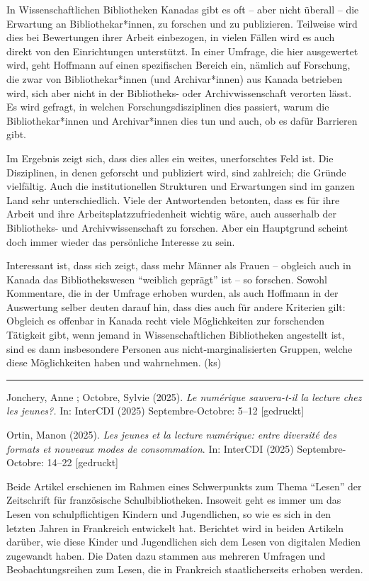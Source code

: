 \documentclass[a4paper,
fontsize=11pt,
oneside,
numbers=noperiodatend,
parskip=half-,
bibliography=totoc,
final
]{scrartcl}
\begin{document}
In Wissenschaftlichen Bibliotheken Kanadas gibt es oft -- aber nicht
überall -- die Erwartung an Bibliothekar*innen, zu forschen und zu
publizieren. Teilweise wird dies bei Bewertungen ihrer Arbeit
einbezogen, in vielen Fällen wird es auch direkt von den Einrichtungen
unterstützt. In einer Umfrage, die hier ausgewertet wird, geht Hoffmann
auf einen spezifischen Bereich ein, nämlich auf Forschung, die zwar von
Bibliothekar*innen (und Archivar*innen) aus Kanada betrieben wird, sich
aber nicht in der Bibliotheks- oder Archivwissenschaft verorten lässt.
Es wird gefragt, in welchen Forschungsdisziplinen dies passiert, warum
die Bibliothekar*innen und Archivar*innen dies tun und auch, ob es dafür
Barrieren gibt.

Im Ergebnis zeigt sich, dass dies alles ein weites, unerforschtes Feld
ist. Die Disziplinen, in denen geforscht und publiziert wird, sind
zahlreich; die Gründe vielfältig. Auch die institutionellen Strukturen
und Erwartungen sind im ganzen Land sehr unterschiedlich. Viele der
Antwortenden betonten, dass es für ihre Arbeit und ihre
Arbeitsplatzzufriedenheit wichtig wäre, auch ausserhalb der Bibliotheks-
und Archivwissenschaft zu forschen. Aber ein Hauptgrund scheint doch
immer wieder das persönliche Interesse zu sein.

Interessant ist, dass sich zeigt, dass mehr Männer als Frauen --
obgleich auch in Kanada das Bibliothekswesen \enquote{weiblich geprägt}
ist -- so forschen. Sowohl Kommentare, die in der Umfrage erhoben
wurden, als auch Hoffmann in der Auswertung selber deuten darauf hin,
dass dies auch für andere Kriterien gilt: Obgleich es offenbar in Kanada
recht viele Möglichkeiten zur forschenden Tätigkeit gibt, wenn jemand in
Wissenschaftlichen Bibliotheken angestellt ist, sind es dann
insbesondere Personen aus nicht-marginalisierten Gruppen, welche diese
Möglichkeiten haben und wahrnehmen. (ks)

\begin{center}\rule{0.5\linewidth}{0.5pt}\end{center}

Jonchery, Anne ; Octobre, Sylvie (2025). \emph{Le numérique sauvera-t-il
la lecture chez les jeunes?.} In: InterCDI (2025) Septembre-Octobre:
5--12 {[}gedruckt{]}

Ortin, Manon (2025). \emph{Les jeunes et la lecture numérique: entre
diversité des formats et nouveaux modes de consommation}. In: InterCDI
(2025) Septembre-Octobre: 14--22 {[}gedruckt{]}

Beide Artikel erschienen im Rahmen eines Schwerpunkts zum Thema
\enquote{Lesen} der Zeitschrift für französische Schulbibliotheken.
Insoweit geht es immer um das Lesen von schulpflichtigen Kindern und
Jugendlichen, so wie es sich in den letzten Jahren in Frankreich
entwickelt hat. Berichtet wird in beiden Artikeln darüber, wie diese
Kinder und Jugendlichen sich dem Lesen von digitalen Medien zugewandt
haben. Die Daten dazu stammen aus mehreren Umfragen und
Beobachtungsreihen zum Lesen, die in Frankreich staatlicherseits erhoben
werden.
\end{document}
